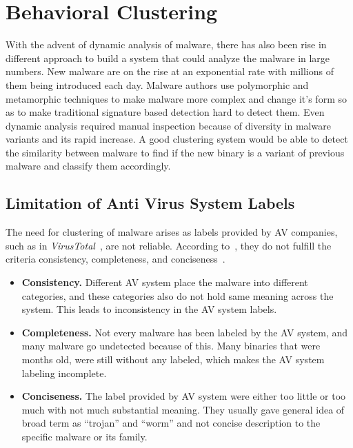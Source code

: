 \section{Behavioral Clustering}
\label{sec:Behavioral Clustering}
With the advent of dynamic analysis of malware, there has also been rise in different approach to build a system that could analyze the malware in large numbers.
New malware are on the rise at an exponential rate with millions of them being introduced each day.
Malware authors use polymorphic and metamorphic techniques to make malware more complex and change it's form so as to make traditional signature based detection hard to detect them.
Even dynamic analysis required manual inspection because of diversity in malware variants and its rapid increase.
A good clustering system would be able to detect the similarity between malware to find if the new binary is a variant of previous malware and classify them accordingly.
\subsection{Limitation of Anti Virus System Labels}
\label{sub:Limitation of Anti Virus System Labels}
The need for clustering of malware arises as labels provided by AV companies, such as in \emph{VirusTotal}~\cite[]{virustotal}, are not reliable.
According to~\citeauthor{bailey}, they do not fulfill the criteria consistency, completeness, and conciseness~\cite[]{bailey}.
\begin{itemize}
\item \textbf{Consistency.} Different AV system place the malware into different categories, and these categories also do not hold same meaning across the system.
This leads to inconsistency in the AV system labels.
\item \textbf{Completeness.} Not every malware has been labeled by the AV system, and many malware go undetected because of this.
Many binaries that were months old, were still without any labeled, which makes the AV system labeling incomplete.
\item \textbf{Conciseness.} The label provided by AV system were either too little or too much with not much substantial meaning.
They usually gave general idea of broad term as ``trojan'' and ``worm'' and not concise description to the specific malware or its family.
\end{itemize}
